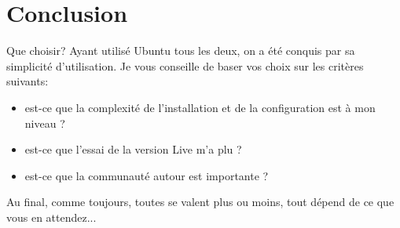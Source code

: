 \documentclass{beamer}
\begin{document}
\section{Conclusion}
\begin{frame}
\begin{block}{Que choisir?}
    Ayant utilisé Ubuntu tous les deux, on a été conquis par sa simplicité d'utilisation. Je vous conseille de baser vos choix sur les critères suivants:
    \begin{itemize}
        \item est-ce que la complexité de l'installation et de la configuration est à mon niveau ? 
        \item est-ce que l'essai de la version Live m'a plu ? 
        \item est-ce que la communauté autour est importante ? 
    \end{itemize}
    Au final, comme toujours, toutes se valent plus ou moins, tout dépend de ce que vous en attendez... 
\end{block}    
\end{frame}



\end{document}
